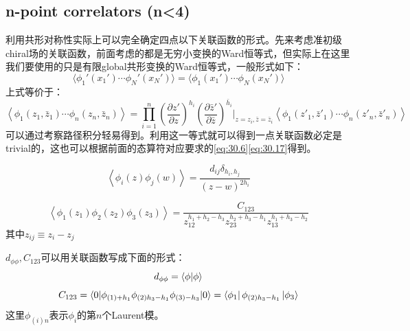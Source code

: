 \subsection{n-point correlators (n<4)}
利用共形对称性实际上可以完全确定四点以下关联函数的形式。先来考虑准初级chiral场的关联函数，前面考虑的都是无穷小变换的Ward恒等式，但实际上在这里我们要使用的只是有限global共形变换的Ward恒等式，一般形式如下：
\begin{equation}\label{global ward}
	\boxed{
	\langle\phi_1'(x_1')\cdots\phi_N'(x_N')\rangle=\langle\phi_1(x_1')\cdots\phi_N(x_N')\rangle
	}
\end{equation}
上式等价于：
\begin{equation}
	\left\langle\phi_{1}\left(z_{1},\bar{z}_{1}\right)\cdots\phi_{n}\left(z_{n},\bar{z}_{n}\right)\right\rangle=\prod_{i=1}^{n}\left(\frac{\partial z'}{\partial z}\right)^{h_{i}}\left(\frac{\partial\bar{z}'}{\partial\bar{z}}\right)^{\bar{h}_{i}}\Bigg|_{z=z_{i},\bar{z}=\bar{z}_{i}}\left\langle\phi_{1}\left(z'_{1},\bar{z}'_{1}\right)\cdots\phi_{n}\left(z'_{n},\bar{z}'_{n}\right)\right\rangle 
\end{equation}
可以通过考察路径积分轻易得到。利用这一等式就可以得到一点关联函数必定是trivial的，这也可以根据前面的态算符对应要求的\ref{eq:30.6}\ref{eq:30.17}得到。
\begin{theorem}[2-pt]
	\begin{equation}\label{31.19}
		\left\langle\phi_i(z)\phi_j(w)\right\rangle=\frac{d_{ij}\delta_{h_i,h_j}}{(z-w)^{2h_i}}
	\end{equation}
\end{theorem}
\begin{theorem}[3-pt]
	\begin{equation}\label{31.20}
		\left\langle\phi_1(z_1)\phi_2(z_2)\phi_3(z_3)\right\rangle=\frac{C_{123}}{z_{12}^{h_1+h_2-h_3}z_{23}^{h_2+h_3-h_1}z_{13}^{h_1+h_3-h_2}}
	\end{equation}
	其中$z_{ij}\equiv z_i-z_j$
\end{theorem}
\begin{remark}
	$d_{\phi\phi},C_{123}$可以用关联函数写成下面的形式：
	\begin{equation}
		d_{\phi\phi}=\braket{\phi}{\phi}
	\end{equation}
	\begin{equation}\label{31.33}
		C_{123}=\langle0|\phi_{(1)+h_1}\phi_{(2)h_3-h_1}\phi_{(3)-h_3}|0\rangle =\bra{\phi_1}\phi_{(2)h_3-h_1}\ket{\phi_3}
	\end{equation}
	这里$\phi_{(i)n}$表示$\phi_i$的第$n$个Laurent模。
\end{remark}
